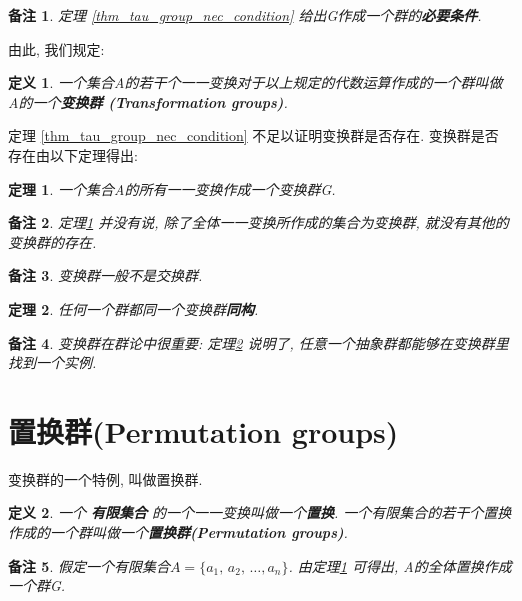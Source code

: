 \documentclass[utf8]{ctexbook}
\newtheorem{theorem}{定理}[section]
\newtheorem{definition}{定义}[section]
\newtheorem{memo}{备注}[section]
\begin{document}
\begin{memo}
 定理 \ref{thm_tau_group_nec_condition} 给出G作成一个群的\textbf{必要条件}.
\end{memo}

由此, 我们规定:
\begin{definition}\label{def_transformation_group}
一个集合A的若干个一一变换对于以上规定的代数运算作成的一个群叫做A的一个\textbf{变换群 (Transformation groups)}.
\end{definition}

定理 \ref{thm_tau_group_nec_condition} 不足以证明变换群是否存在. 变换群是否存在由以下定理得出:

\begin{theorem}\label{thm_oneone_tau_group}
一个集合A的所有一一变换作成一个变换群G. 
\end{theorem}

\begin{memo}
定理\ref{thm_oneone_tau_group} 并没有说, 除了全体一一变换所作成的集合为变换群, 就没有其他的变换群的存在.
\end{memo}

\begin{memo}
变换群一般不是交换群. 
\end{memo}

\begin{theorem}\label{thm_all_groups_map_to_tau_group}
任何一个群都同一个变换群\textbf{同构}.
\end{theorem}
\begin{memo}
变换群在群论中很重要: 定理\ref{thm_all_groups_map_to_tau_group} 说明了, 任意一个抽象群都能够在变换群里找到一个实例.
\end{memo}


\section{置换群(Permutation groups)}

变换群的一个特例, 叫做置换群.

\begin{definition}\label{def_permutation_groups}
一个 \textbf{有限集合} 的一个一一变换叫做一个\textbf{置换}. 一个有限集合的若干个置换作成的一个群叫做一个\textbf{置换群(Permutation groups)}.
\end{definition}

\begin{memo}
假定一个有限集合$A = \{a_1, \, a_2, \, \ldots, a_n \}$. 由定理\ref{thm_oneone_tau_group} 可得出, A的全体置换作成一个群G. 
\end{memo}
\end{document}
